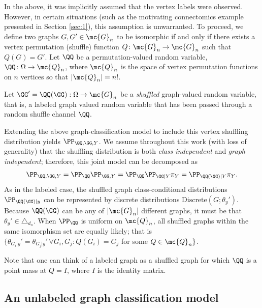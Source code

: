 \documentclass[10pt,journal,cspaper,compsoc]{IEEEtran}
\newcommand{\Qs}{Q}
\begin{document}
In the above, it was implicitly assumed that the vertex labels were observed.  However, in certain situations (such as the motivating connectomics example presented in Section \ref{sec:1}), this assumption is unwarranted.  To proceed, we define two graphs $G,G' \in \mc{G}_n$ to be isomorphic if and only if there exists a vertex permutation (shuffle) function $\Qs\colon\mc{G}_n \to \mc{G}_n$ such that $\Qs(G)=G'$.  Let $\QQ$ be a permutation-valued random variable, $\QQ\colon \Omega \to \mc{Q}_n$, where $\mc{Q}_n$ is the space of vertex permutation functions on $n$ vertices so that $|\mc{Q}_n|=n!$.  
\begin{defi} \label{def:shuffled}
Let $\GG'=\QQ(\GG): \Omega \to \mc{G}_n$ be a \emph{shuffled} graph-valued random variable, that is, a labeled graph valued random variable that has been passed through a random shuffle channel $\QQ$. %
\end{defi}

Extending the above graph-classification model to include this vertex shuffling distribution yields $\PP_{\QQ,\GG,Y}$.  We assume throughout this work (with loss of generality) that the shuffling distribution is both \emph{class independent} and \emph{graph independent}; therefore, this joint model can be decomposed as
\begin{align}
	\PP_{\QQ,\GG,Y} = \PP_{\QQ} \PP_{\GG,Y} = \PP_{\QQ} \PP_{\GG |Y} \pi_Y = \PP_{\QQ(\GG) |Y} \pi_Y.
\end{align}
As in the labeled case, the shuffled graph class-conditional distributions $\PP_{\QQ(\GG)|y}$ can be represented by discrete distributions $\text{Discrete}(G; \theta_y')$.  Because $\QQ(\GG)$ can be any of $|\mc{G}_n|$ different graphs, it must be that $\theta_y' \in \triangle_{d_n}$.  When $\PP_{\QQ}$ is uniform on $\mc{Q}_n$, all shuffled graphs within the same isomorphism set are equally likely; that is  $\{\theta_{G_i|y}' = \theta_{G_j|y}' \, \forall G_i,G_j \colon \Qs(G_i)=G_j$ for some $\Qs \in \mc{Q}_n\}$.

Note that one can think of a labeled graph as a shuffled graph for which $\QQ$ is a point mass at  $Q=I$, where $I$ is the identity matrix.


\subsection{An unlabeled graph classification model} %
\label{sub:an_unlabeled_graph_classification_model}
\end{document}
